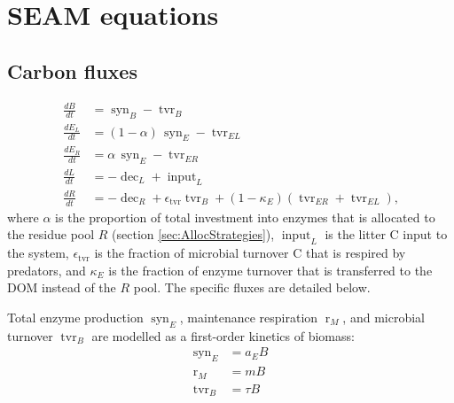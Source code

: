 \section{SEAM equations \label{app:SEAM}}    

\subsection{Carbon fluxes}
\begin{subequations}
\label{eq:SEAM}
\begin{align}
\frac{dB}{dt} &= \operatorname{syn}_B - \operatorname{tvr}_B \\
\frac{dE_L}{dt} &= (1 - \alpha)  \, \operatorname{syn}_E -\operatorname{tvr}_{EL}\\
\frac{dE_R}{dt} &= \alpha \, \operatorname{syn}_E - \operatorname{tvr}_{ER} \\
\frac{dL}{dt} &=  - \operatorname{dec}_L + \operatorname{input}_L
\\
\frac{dR}{dt} &=  - \operatorname{dec}_R +
\epsilon_{\operatorname{tvr}}  \operatorname{tvr}_B + (1 -\kappa_E)
(\operatorname{tvr}_{ER} + \operatorname{tvr}_{EL})
\text{,} 
\end{align}
\end{subequations}
where $\alpha$ is the proportion of total investment into enzymes
that is allocated to the residue pool $R$ (section
\ref{sec:AllocStrategies}), $\operatorname{input}_L$
is the litter C input to the system, $\epsilon_{\operatorname{tvr}}$ is the
fraction of microbial turnover C that is respired by predators, and $\kappa_E$ is the fraction of enzyme turnover
that is transferred to the DOM instead of the $R$ pool.
The specific fluxes are detailed below.

Total enzyme production $\operatorname{syn}_E$, maintenance respiration
$\operatorname{r}_{M}$, and microbial turnover $\operatorname{tvr}_B$ are
modelled as a first-order kinetics of biomass:
\begin{subequations}
\begin{align}
\label{eq:synE} \operatorname{syn}_E &= a_E B \\
\label{eq:rM} \operatorname{r}_{M} &= m B \\
\label{eq:tvrB} \operatorname{tvr}_B &= \tau B 
\end{align}
\end{subequations}

